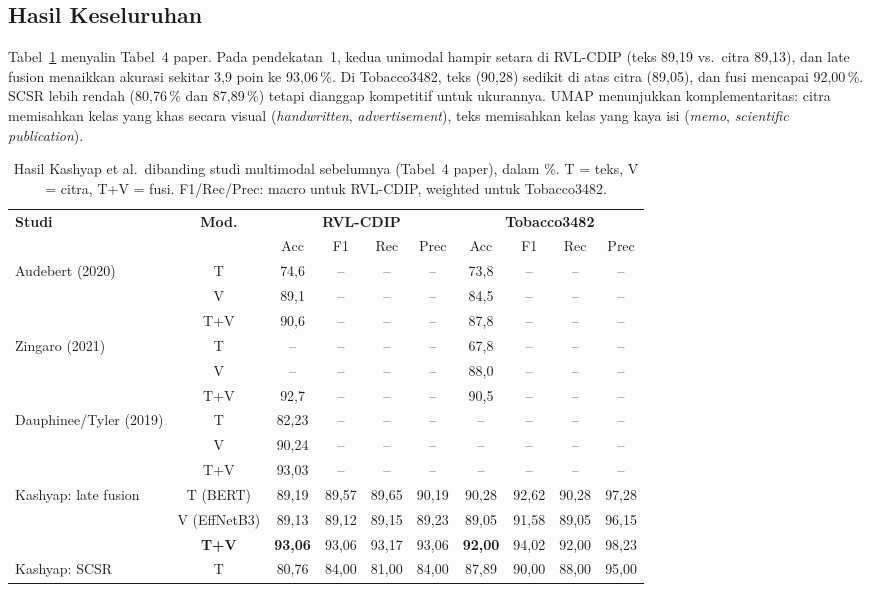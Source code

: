 \subsection{Hasil Keseluruhan}
Tabel~\ref{tab:kas-utama} menyalin Tabel~4 paper. Pada pendekatan~1, kedua unimodal
hampir setara di RVL-CDIP (teks 89,19 vs.\ citra 89,13), dan late fusion menaikkan
akurasi sekitar 3,9 poin ke 93,06\,\%. Di Tobacco3482, teks (90,28) sedikit di atas citra
(89,05), dan fusi mencapai 92,00\,\%. SCSR lebih rendah (80,76\,\% dan 87,89\,\%) tetapi
dianggap kompetitif untuk ukurannya. UMAP menunjukkan komplementaritas: citra memisahkan
kelas yang khas secara visual (\emph{handwritten}, \emph{advertisement}), teks memisahkan
kelas yang kaya isi (\emph{memo}, \emph{scientific publication}).

\begin{table}[H]
  \centering
  \caption{Hasil Kashyap et al.\ dibanding studi multimodal sebelumnya (Tabel~4 paper), dalam \%.
           T = teks, V = citra, T+V = fusi. F1/Rec/Prec: macro untuk RVL-CDIP, weighted untuk Tobacco3482.}
  \label{tab:kas-utama}
  \fontsize{9}{11}\selectfont
  \setlength\tabcolsep{4pt}
  \begin{tabular}{|l|c|c|c|c|c|c|c|c|c|}
    \hline
    \multirow{2}{*}{\textbf{Studi}} & \multirow{2}{*}{\textbf{Mod.}} & \multicolumn{4}{c|}{\textbf{RVL-CDIP}} & \multicolumn{4}{c|}{\textbf{Tobacco3482}} \\ \cline{3-10}
     & & Acc & F1 & Rec & Prec & Acc & F1 & Rec & Prec \\ \hline
    \multirow{3}{*}{Audebert (2020)} & T & 74,6 & -- & -- & -- & 73,8 & -- & -- & -- \\
     & V & 89,1 & -- & -- & -- & 84,5 & -- & -- & -- \\
     & T+V & 90,6 & -- & -- & -- & 87,8 & -- & -- & -- \\ \hline
    \multirow{3}{*}{Zingaro (2021)} & T & -- & -- & -- & -- & 67,8 & -- & -- & -- \\
     & V & -- & -- & -- & -- & 88,0 & -- & -- & -- \\
     & T+V & 92,7 & -- & -- & -- & 90,5 & -- & -- & -- \\ \hline
    \multirow{3}{*}{Dauphinee/Tyler (2019)} & T & 82,23 & -- & -- & -- & -- & -- & -- & -- \\
     & V & 90,24 & -- & -- & -- & -- & -- & -- & -- \\
     & T+V & 93,03 & -- & -- & -- & -- & -- & -- & -- \\ \hline
    \multirow{3}{*}{Kashyap: late fusion} & T (BERT) & 89,19 & 89,57 & 89,65 & 90,19 & 90,28 & 92,62 & 90,28 & 97,28 \\
     & V (EffNetB3) & 89,13 & 89,12 & 89,15 & 89,23 & 89,05 & 91,58 & 89,05 & 96,15 \\
     & \textbf{T+V} & \textbf{93,06} & 93,06 & 93,17 & 93,06 & \textbf{92,00} & 94,02 & 92,00 & 98,23 \\ \hline
    Kashyap: SCSR & T & 80,76 & 84,00 & 81,00 & 84,00 & 87,89 & 90,00 & 88,00 & 95,00 \\ \hline
  \end{tabular}
\end{table}

